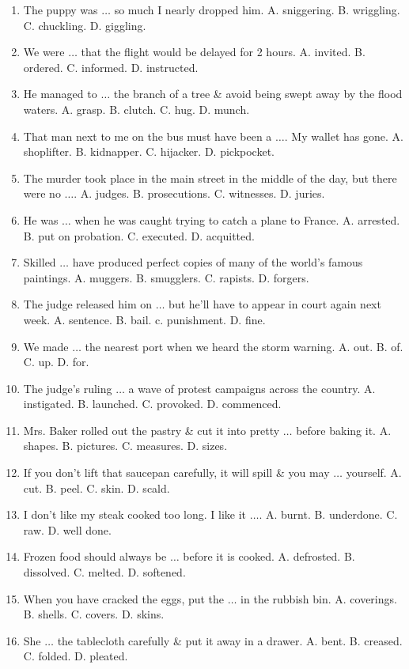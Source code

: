 \documentclass{article}
\numberwithin{equation}{section}
\begin{document}
\begin{enumerate}[leftmargin=2mm]
	\item The puppy was $\ldots$ so much I nearly dropped him. A. sniggering. B. wriggling. C. chuckling. D. giggling.
	\item We were $\ldots$ that the flight would be delayed for 2 hours. A. invited. B. ordered. C. informed. D. instructed.
	\item He managed to $\ldots$ the branch of a tree \& avoid being swept away by the flood waters. A. grasp. B. clutch. C. hug. D. munch.
	\item That man next to me on the bus must have been a $\ldots$. My wallet has gone. A. shoplifter. B. kidnapper. C. hijacker. D. pickpocket.
	\item The murder took place in the main street in the middle of the day, but there were no $\ldots$. A. judges. B. prosecutions. C. witnesses. D. juries.
	\item He was $\ldots$ when he was caught trying to catch a plane to France. A. arrested. B. put on probation. C. executed. D. acquitted.
	\item Skilled $\ldots$ have produced perfect copies of many of the world's famous paintings. A. muggers. B. smugglers. C. rapists. D. forgers.
	\item The judge released him on $\ldots$ but he'll have to appear in court again next week. A. sentence. B. bail. c. punishment. D. fine.
	\item We made $\ldots$ the nearest port when we heard the storm warning. A. out. B. of. C. up. D. for.
	\item The judge's ruling $\ldots$ a wave of protest campaigns across the country. A. instigated. B. launched. C. provoked. D. commenced.
	\item Mrs. Baker rolled out the pastry \& cut it into pretty $\ldots$ before baking it. A. shapes. B. pictures. C. measures. D. sizes.
	\item If you don't lift that saucepan carefully, it will spill \& you may $\ldots$ yourself. A. cut. B. peel. C. skin. D. scald.
	\item I don't like my steak cooked too long. I like it $\ldots$. A. burnt. B. underdone. C. raw. D. well done.
	\item Frozen food should always be $\ldots$ before it is cooked. A. defrosted. B. dissolved. C. melted. D. softened.
	\item When you have cracked the eggs, put the $\ldots$ in the rubbish bin. A. coverings. B. shells. C. covers. D. skins.
	\item She $\ldots$ the tablecloth carefully \& put it away in a drawer. A. bent. B. creased. C. folded. D. pleated.

\end{enumerate}
\end{document}
